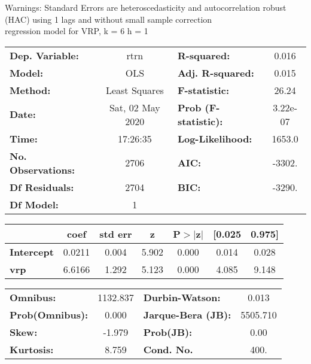Warnings: \newline
 [1] Standard Errors are heteroscedasticity and autocorrelation robust (HAC) using 1 lags and without small sample correction\\ 

regression model for VRP, k = 6 h = 1\begin{center}
\begin{tabular}{lclc}
\toprule
\textbf{Dep. Variable:}    &       rtrn       & \textbf{  R-squared:         } &     0.016   \\
\textbf{Model:}            &       OLS        & \textbf{  Adj. R-squared:    } &     0.015   \\
\textbf{Method:}           &  Least Squares   & \textbf{  F-statistic:       } &     26.24   \\
\textbf{Date:}             & Sat, 02 May 2020 & \textbf{  Prob (F-statistic):} &  3.22e-07   \\
\textbf{Time:}             &     17:26:35     & \textbf{  Log-Likelihood:    } &    1653.0   \\
\textbf{No. Observations:} &        2706      & \textbf{  AIC:               } &    -3302.   \\
\textbf{Df Residuals:}     &        2704      & \textbf{  BIC:               } &    -3290.   \\
\textbf{Df Model:}         &           1      & \textbf{                     } &             \\
\bottomrule
\end{tabular}
\begin{tabular}{lcccccc}
                   & \textbf{coef} & \textbf{std err} & \textbf{z} & \textbf{P$> |$z$|$} & \textbf{[0.025} & \textbf{0.975]}  \\
\midrule
\textbf{Intercept} &       0.0211  &        0.004     &     5.902  &         0.000        &        0.014    &        0.028     \\
\textbf{vrp}       &       6.6166  &        1.292     &     5.123  &         0.000        &        4.085    &        9.148     \\
\bottomrule
\end{tabular}
\begin{tabular}{lclc}
\textbf{Omnibus:}       & 1132.837 & \textbf{  Durbin-Watson:     } &    0.013  \\
\textbf{Prob(Omnibus):} &   0.000  & \textbf{  Jarque-Bera (JB):  } & 5505.710  \\
\textbf{Skew:}          &  -1.979  & \textbf{  Prob(JB):          } &     0.00  \\
\textbf{Kurtosis:}      &   8.759  & \textbf{  Cond. No.          } &     400.  \\
\bottomrule
\end{tabular}
\end{center}

